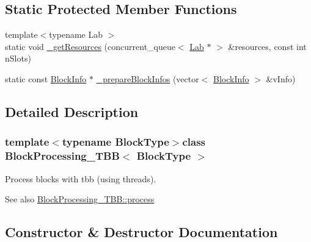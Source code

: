 \subsection*{Static Protected Member Functions}
\begin{DoxyCompactItemize}
\item 
{\footnotesize template$<$typename Lab $>$ }\\static void \hyperlink{class_block_processing___t_b_b_a4a77964ec9a1bbf0054f4e5e511ae8ea}{\+\_\+get\+Resources} (concurrent\+\_\+queue$<$ \hyperlink{_definitions_8h_ae720d9054713370bbf4c86860e4dde70}{Lab} $\ast$ $>$ \&resources, const int n\+Slots)
\item 
static const \hyperlink{struct_block_info}{Block\+Info} $\ast$ \hyperlink{class_block_processing___t_b_b_a5316cc197b479887abb3c9b74cdf9c31}{\+\_\+prepare\+Block\+Infos} (vector$<$ \hyperlink{struct_block_info}{Block\+Info} $>$ \&v\+Info)
\end{DoxyCompactItemize}


\subsection{Detailed Description}
\subsubsection*{template$<$typename Block\+Type$>$class Block\+Processing\+\_\+\+T\+B\+B$<$ Block\+Type $>$}

Process blocks with tbb (using threads). \begin{DoxySeeAlso}{See also}
\hyperlink{class_block_processing___t_b_b_afb4ac5aee8af3d4e9f3a0f572bdd0a04}{Block\+Processing\+\_\+\+T\+B\+B\+::process} 
\end{DoxySeeAlso}


\subsection{Constructor \& Destructor Documentation}
\hypertarget{class_block_processing___t_b_b_a1a3d202984fe1c763a1d3a60ed1c8da8}{}
